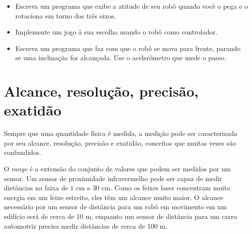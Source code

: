 \begin{framed}

\begin{itemize}
\item Escreva um programa que exibe a atitude de seu robô quando você o pega e o rotaciona em torno dos três eixos.

\item Implemente um jogo à sua escolha usando o robô como controlador.

\item Escreva um programa que faz com que o robô se mova para frente, parando se uma inclinação for alcançada. Use o acelerômetro que mede o passo.
\end{itemize}
\end{framed}

\section{Alcance, resolução, precisão, exatidão}\label{s.range}

Sempre que uma quantidade física é medida, a medição pode ser caracterizada por seu alcance, resolução, precisão e exatidão, conceitos que muitas vezes são confundidos.

O \emph{range} é a extensão do conjunto de valores que podem ser medidos por um sensor. Um sensor de proximidade infravermelho pode ser capaz de medir distâncias na faixa de $1$ cm a $30$ cm. Como os feixes laser concentram muita energia em um feixe estreito, eles têm um alcance muito maior. O alcance necessário por um sensor de distância para um robô em movimento em um edifício será de cerca de 10 m, enquanto um sensor de distância para um carro automotriz precisa medir distâncias de cerca de 100 m.

